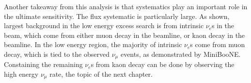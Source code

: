 Another takeaway from this analysis is that systematics play an important role in the ultimate sensitivity. The flux systematic is particularly large. As shown, largest background in the low energy excess search is from intrinsic $\nu_e$s in the beam, which come from either muon decay in the beamline, or kaon decay in the beamline. In the low energy region, the majority of intrinsic $\nu_e$s come from muon decay, which is tied to the observed $\nu_\mu$ events, as demonstrated by MiniBooNE. Constaining the remaining $\nu_e$s from kaon decay can be done by observing the high energy $\nu_\mu$ rate, the topic of the next chapter.

